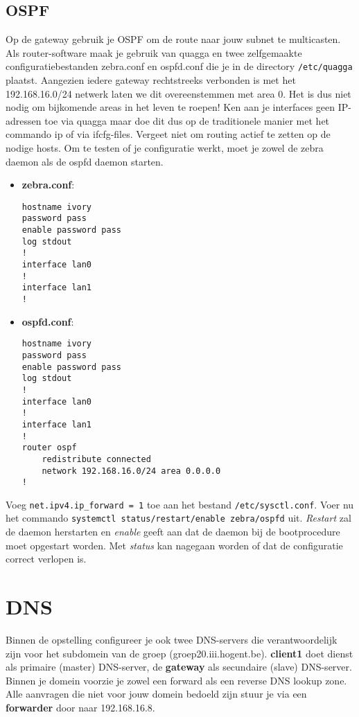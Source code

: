 \documentclass{report}
\begin{document}
\subsection{OSPF}

Op de gateway gebruik je OSPF om de route naar jouw subnet te multicasten. Als router-software maak je gebruik van quagga en twee zelfgemaakte configuratiebestanden zebra.conf en ospfd.conf die je in de directory \texttt{/etc/quagga} plaatst. Aangezien iedere gateway rechtstreeks verbonden is met het 192.168.16.0/24 netwerk laten we dit overeenstemmen met area 0. Het is dus niet nodig om bijkomende areas in het leven te roepen!
Ken aan je interfaces geen IP-adressen toe via quagga maar doe dit dus op de traditionele manier met het commando ip of via ifcfg-files.
Vergeet niet om routing actief te zetten op de nodige hosts.
Om te testen of je configuratie werkt, moet je zowel de zebra daemon als de ospfd daemon starten. 

\begin{itemize}
	\item \textbf{zebra.conf}:
		\begin{lstlisting}
hostname ivory
password pass
enable password pass
log stdout
!
interface lan0
!
interface lan1
!
		\end{lstlisting}
	\item \textbf{ospfd.conf}:
		\begin{lstlisting}
hostname ivory
password pass
enable password pass
log stdout
!
interface lan0
!
interface lan1
!
router ospf
	redistribute connected
	network 192.168.16.0/24 area 0.0.0.0
!
\end{lstlisting}

\end{itemize}
Voeg \texttt{net.ipv4.ip\_forward = 1} toe aan het bestand \texttt{/etc/sysctl.conf}. 
Voer nu het commando \texttt{systemctl status/restart/enable zebra/ospfd} uit. \textit{Restart} zal de daemon herstarten en \textit{enable} geeft aan dat de daemon bij de bootprocedure moet opgestart worden. Met \textit{status} kan nagegaan worden of dat de configuratie correct verlopen is.
\section{DNS}
Binnen de opstelling configureer je ook twee DNS-servers die verantwoordelijk zijn voor het subdomein van de groep (groep20.iii.hogent.be). \textbf{client1} doet dienst als primaire (master) DNS-server, de \textbf{gateway} als secundaire (slave) DNS-server. Binnen je domein voorzie je zowel een forward als een reverse DNS lookup zone. Alle aanvragen die niet voor jouw domein bedoeld zijn stuur je via een \textbf{forwarder} door naar 192.168.16.8. 
\end{document}
